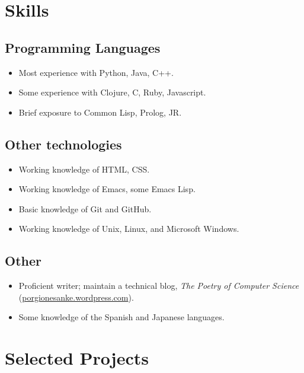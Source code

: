 \documentclass[12pt]{article}
\begin{document}
\section*{Skills}
\label{sec-3}
\subsection*{Programming Languages}
\label{sec-3-1}

\begin{itemize}
\item Most experience with Python, Java, C++.
\item Some experience with Clojure, C, Ruby, Javascript.
\item Brief exposure to Common Lisp, Prolog, JR.
\end{itemize}
\subsection*{Other technologies}
\label{sec-3-2}

\begin{itemize}
\item Working knowledge of HTML, CSS.
\item Working knowledge of Emacs, some Emacs Lisp.
\item Basic knowledge of Git and GitHub.
\item Working knowledge of Unix, Linux, and Microsoft Windows.
\end{itemize}
\subsection*{Other}
\label{sec-3-3}

\begin{itemize}
\item Proficient writer; maintain a technical blog, \textit{The Poetry of Computer Science} (\href{http://porgionesanke.wordpress.com}{porgionesanke.wordpress.com}).
\item Some knowledge of the Spanish and Japanese languages.
\end{itemize}
\section*{Selected Projects}
\label{sec-4}
\end{document}
